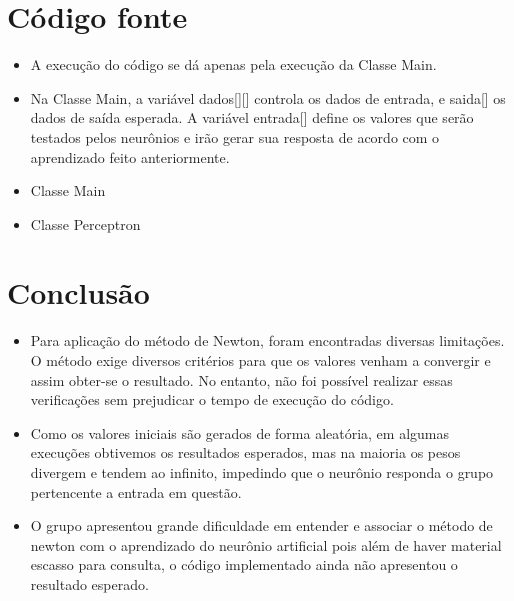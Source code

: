 \documentclass[12pt]{article}
\begin{document}
\section{Código fonte}
\begin{itemize}
    \item A execução do código se dá apenas pela execução da Classe Main.
    \item Na Classe Main, a variável dados[][] controla os dados de entrada, e saida[] os dados de saída esperada. A variável entrada[] define os valores que serão testados pelos neurônios e irão gerar sua resposta de acordo com o aprendizado feito anteriormente.
    \item Classe Main
\end{itemize}



\begin{itemize}
    \item Classe Perceptron
\end{itemize}


\section{Conclusão}

\begin{itemize}
    \item Para aplicação do método de Newton, foram encontradas diversas limitações. O método exige diversos critérios para que os valores venham a convergir e assim obter-se o resultado. No entanto, não foi possível realizar essas verificações sem prejudicar o tempo de execução do código.
    \item Como os valores iniciais são gerados de forma aleatória, em algumas execuções obtivemos os resultados esperados, mas na maioria os pesos divergem e tendem ao infinito, impedindo que o neurônio responda o grupo pertencente a entrada em questão.
    \item O grupo apresentou grande dificuldade em entender e associar o método de newton com o aprendizado do neurônio artificial pois além de haver material escasso para consulta, o código implementado ainda não apresentou o resultado esperado.
\end{itemize}
\end{document}
